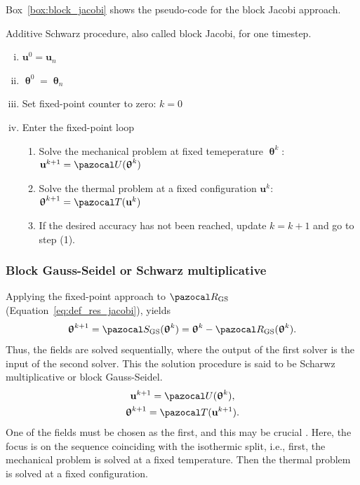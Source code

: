 Box~\ref{box:block_jacobi} shows the pseudo-code for the block Jacobi approach.

\begin{framedbox}[htb]
  \caption{Additive Schwarz procedure, also called block Jacobi, for one timestep.}
  \label{box:block_jacobi}
  \begin{center}
    \begin{minipage}{0.9\textwidth}
    \begin{enumerate}[(i)]
    \item \(\mathbf u^0 = \mathbf u_{n}\)
    \item \(\bm \uptheta^0 = \bm \uptheta_n\)
    \item Set fixed-point counter to zero: \(k=0\)
    \item Enter the fixed-point loop
    \begin{enumerate}[(1)]
      \item Solve the mechanical problem at fixed temeperature \(\bm \uptheta^k\): \(\mathbf u^{k+1} = \pazocal U(\bm \uptheta^k)\)
      \item Solve the thermal problem at a fixed configuration \(\mathbf u^k\): \(\bm \uptheta^{k+1} = \pazocal T(\mathbf u^k)\)
      \item If the desired accuracy has not been reached, update \(k=k+1\) and go to step (1).

    \end{enumerate}
    \end{enumerate}
    \end{minipage}
  \end{center}
\end{framedbox}

\subsubsection{Block Gauss-Seidel or Schwarz multiplicative}

Applying the fixed-point approach to \(\pazocal R_\mathrm{GS}\) (Equation~\eqref{eq:def_res_jacobi}), yields
\begin{equation}
  \bm\uptheta^{k+1} = \pazocal S_\mathrm{GS}(\bm\uptheta^k) =  \bm\uptheta^k - \pazocal R_\mathrm{GS}(\bm \uptheta^k).
\end{equation}
Thus, the fields are solved sequentially, where the output of the first solver is the input of the second solver.
This the solution procedure is said to be Scharwz multiplicative or block Gauss-Seidel.
\begin{gather}
\mathbf u^{k+1}  = \pazocal U(\bm \uptheta^k),\\
\bm \uptheta^{k+1} = \pazocal T(\mathbf u^{k+1}).
\end{gather}
One of the fields must be chosen as the first, and this may be crucial \citep{joosten_analysis_2009}.
Here, the focus is on the sequence coinciding with the isothermic split, i.e., first, the mechanical problem is solved at a fixed temperature.
Then the thermal problem is solved at a fixed configuration.

